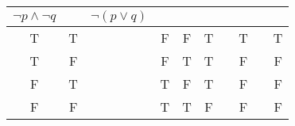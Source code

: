 \begin{enumerate}
\begin{tabular}{ | c | c | c | c |  c | c | c | c | c | c | }
                $ \neg p \land \neg q $ & &
                $ \neg ( p \lor q ) $
                \\ \hline
            T & T & & F & F
            &  T  &
            &  T  &
            &  T 
            \\ \hline
            T & F & & F & T
            &  T  &
            &  F  &
            &  F 
            \\ \hline
            F & T & & T & F
            &  T  &
            &  F  &
            &  F 
            \\ \hline
            F & F & & T & T
            &  F  &
            &  F  &
            &  F 
            \\ \hline
        \end{tabular}
    \end{enumerate}



